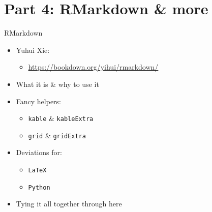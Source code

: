 \documentclass[ignorenonframetext,]{beamer}
\providecommand{\tightlist}{%
  \setlength{\itemsep}{0pt}\setlength{\parskip}{0pt}}
\begin{document}
\hypertarget{part-4-rmarkdown-more}{%
\section{Part 4: RMarkdown \& more}\label{part-4-rmarkdown-more}}

\begin{frame}[fragile]{RMarkdown}
\protect\hypertarget{rmarkdown}{}

\begin{itemize}
\tightlist
\item
  Yuhui Xie:

  \begin{itemize}
  \tightlist
  \item
    \url{https://bookdown.org/yihui/rmarkdown/}
  \end{itemize}
\item
  What it is \& why to use it
\item
  Fancy helpers:

  \begin{itemize}
  \tightlist
  \item
    \texttt{kable} \& \texttt{kableExtra}
  \item
    \texttt{grid} \& \texttt{gridExtra}
  \end{itemize}
\item
  Deviations for:

  \begin{itemize}
  \tightlist
  \item
    \texttt{LaTeX}
  \item
    \texttt{Python}
  \end{itemize}
\item
  Tying it all together through here
\end{itemize}

\end{frame}
\end{document}
